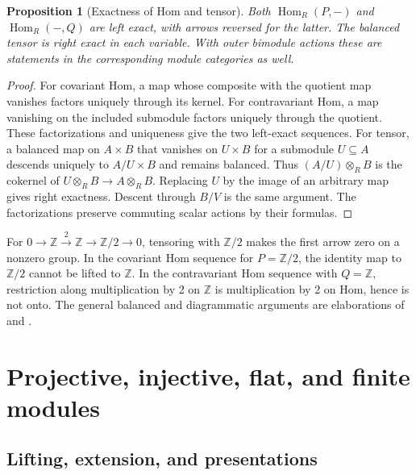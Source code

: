 \documentclass[11pt,oneside,openany]{book}
\newtheorem{proposition}[theorem]{Proposition}
\theoremstyle{definition}
\theoremstyle{remark}
\begin{document}
\begin{proposition}[Exactness of Hom and tensor]
\label{p103:ALG-03-C02-R01}
Both \(\operatorname{Hom}_R(P,-)\) and \(\operatorname{Hom}_R(-,Q)\)
are left exact, with arrows reversed for the latter.
The balanced tensor is right exact in each variable. With outer
bimodule actions these are statements in the corresponding module
categories as well.
\end{proposition}
\begin{proof}
For covariant Hom, a map whose composite with the quotient map
vanishes factors uniquely through its kernel. For contravariant
Hom, a map vanishing on the included submodule factors uniquely
through the quotient. These factorizations and uniqueness give the
two left-exact sequences. For tensor, a balanced map on \(A\times B\)
that vanishes on \(U\times B\) for a submodule \(U\subseteq A\)
descends uniquely to \(A/U\times B\) and remains balanced.
Thus \((A/U)\otimes_R B\) is the cokernel of
\(U\otimes_R B\to A\otimes_R B\). Replacing \(U\) by the image of
an arbitrary map gives right exactness. Descent through \(B/V\)
is the same argument. The factorizations preserve commuting
scalar actions by their formulas.
\end{proof}

For \(0\to\mathbb Z\xrightarrow{2}\mathbb Z\to\mathbb Z/2\to0\),
tensoring with \(\mathbb Z/2\) makes the first arrow zero on a
nonzero group. In the covariant Hom sequence for
\(P=\mathbb Z/2\), the identity map to \(\mathbb Z/2\) cannot be
lifted to \(\mathbb Z\). In the contravariant Hom sequence with
\(Q=\mathbb Z\), restriction along multiplication by 2 on
\(\mathbb Z\) is multiplication by 2 on Hom, hence is not onto.
The general balanced and diagrammatic arguments are elaborations
of \cite[Sections 10.4--10.5]{dummit} and
\cite[Theorems 2.75--2.76]{rotman}.
\chapter[Projective, injective, flat, and finite modules]
{Projective, injective, flat, and finite modules}
\label{p103:ch02}

\section{Lifting, extension, and presentations}
\end{document}
